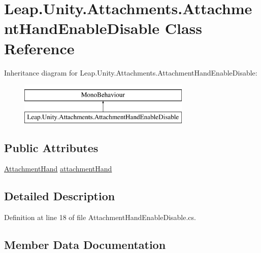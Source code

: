 \hypertarget{class_leap_1_1_unity_1_1_attachments_1_1_attachment_hand_enable_disable}{}\section{Leap.\+Unity.\+Attachments.\+Attachment\+Hand\+Enable\+Disable Class Reference}
\label{class_leap_1_1_unity_1_1_attachments_1_1_attachment_hand_enable_disable}
Inheritance diagram for Leap.\+Unity.\+Attachments.\+Attachment\+Hand\+Enable\+Disable\+:\begin{figure}[H]
\begin{center}
\leavevmode
\includegraphics[height=2.000000cm]{class_leap_1_1_unity_1_1_attachments_1_1_attachment_hand_enable_disable}
\end{center}
\end{figure}
\subsection*{Public Attributes}
\begin{DoxyCompactItemize}
\item 
\mbox{\hyperlink{class_leap_1_1_unity_1_1_attachments_1_1_attachment_hand}{Attachment\+Hand}} \mbox{\hyperlink{class_leap_1_1_unity_1_1_attachments_1_1_attachment_hand_enable_disable_a2e57e2bb89461ef229c20ebed84161de}{attachment\+Hand}}
\end{DoxyCompactItemize}


\subsection{Detailed Description}


Definition at line 18 of file Attachment\+Hand\+Enable\+Disable.\+cs.



\subsection{Member Data Documentation}
\mbox{\label{class_leap_1_1_unity_1_1_attachments_1_1_attachment_hand_enable_disable_a2e57e2bb89461ef229c20ebed84161de}} 
